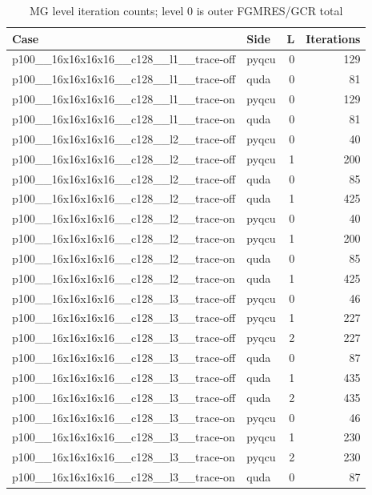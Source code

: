 \begin{table}[htbp]
\centering
\caption{MG level iteration counts; level 0 is outer FGMRES/GCR total}
\small
\begin{tabular}{@{}llrr@{}}
\toprule
Case & Side & L & Iterations \\
\midrule
p100\_\_16x16x16x16\_\_c128\_\_l1\_\_trace-off & pyqcu & 0 & 129 \\
p100\_\_16x16x16x16\_\_c128\_\_l1\_\_trace-off & quda & 0 & 81 \\
p100\_\_16x16x16x16\_\_c128\_\_l1\_\_trace-on & pyqcu & 0 & 129 \\
p100\_\_16x16x16x16\_\_c128\_\_l1\_\_trace-on & quda & 0 & 81 \\
p100\_\_16x16x16x16\_\_c128\_\_l2\_\_trace-off & pyqcu & 0 & 40 \\
p100\_\_16x16x16x16\_\_c128\_\_l2\_\_trace-off & pyqcu & 1 & 200 \\
p100\_\_16x16x16x16\_\_c128\_\_l2\_\_trace-off & quda & 0 & 85 \\
p100\_\_16x16x16x16\_\_c128\_\_l2\_\_trace-off & quda & 1 & 425 \\
p100\_\_16x16x16x16\_\_c128\_\_l2\_\_trace-on & pyqcu & 0 & 40 \\
p100\_\_16x16x16x16\_\_c128\_\_l2\_\_trace-on & pyqcu & 1 & 200 \\
p100\_\_16x16x16x16\_\_c128\_\_l2\_\_trace-on & quda & 0 & 85 \\
p100\_\_16x16x16x16\_\_c128\_\_l2\_\_trace-on & quda & 1 & 425 \\
p100\_\_16x16x16x16\_\_c128\_\_l3\_\_trace-off & pyqcu & 0 & 46 \\
p100\_\_16x16x16x16\_\_c128\_\_l3\_\_trace-off & pyqcu & 1 & 227 \\
p100\_\_16x16x16x16\_\_c128\_\_l3\_\_trace-off & pyqcu & 2 & 227 \\
p100\_\_16x16x16x16\_\_c128\_\_l3\_\_trace-off & quda & 0 & 87 \\
p100\_\_16x16x16x16\_\_c128\_\_l3\_\_trace-off & quda & 1 & 435 \\
p100\_\_16x16x16x16\_\_c128\_\_l3\_\_trace-off & quda & 2 & 435 \\
p100\_\_16x16x16x16\_\_c128\_\_l3\_\_trace-on & pyqcu & 0 & 46 \\
p100\_\_16x16x16x16\_\_c128\_\_l3\_\_trace-on & pyqcu & 1 & 230 \\
p100\_\_16x16x16x16\_\_c128\_\_l3\_\_trace-on & pyqcu & 2 & 230 \\
p100\_\_16x16x16x16\_\_c128\_\_l3\_\_trace-on & quda & 0 & 87 \\

\end{tabular}
\end{table}
